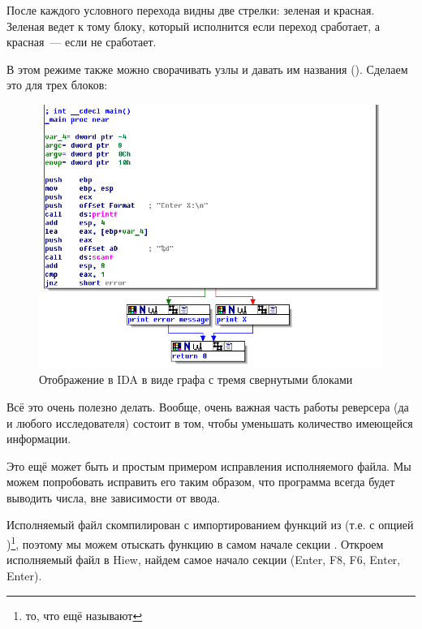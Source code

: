 После каждого условного перехода видны две стрелки: зеленая и красная.
Зеленая ведет к тому блоку, который исполнится если переход сработает, 
а красная~--- если не сработает.

\clearpage
В этом режиме также можно сворачивать узлы и давать им названия ().
Сделаем это для трех блоков:

\begin{figure}[H]
\centering
\includegraphics[scale=\FigScale]{patterns/04_scanf/3_checking_retval/IDA2.png}
\caption{Отображение в IDA в виде графа с тремя свернутыми блоками}
\label{fig:ex3_IDA_2}
\end{figure}

Всё это очень полезно делать.
Вообще, очень важная часть работы реверсера (да и любого исследователя) состоит в том, чтобы уменьшать количество имеющейся информации.



\clearpage
{}

Это ещё может быть и простым примером исправления исполняемого файла.
Мы можем попробовать исправить его таким образом, что программа всегда будет выводить числа, вне зависимости от ввода.

Исполняемый файл скомпилирован с импортированием функций из
 (т.е. с опцией )\footnote{то, что ещё называют }, 
поэтому мы можем отыскать функцию \main в самом начале секции .
Откроем исполняемый файл в Hiew, найдем самое начало секции  (Enter, F8, F6, Enter, Enter).

